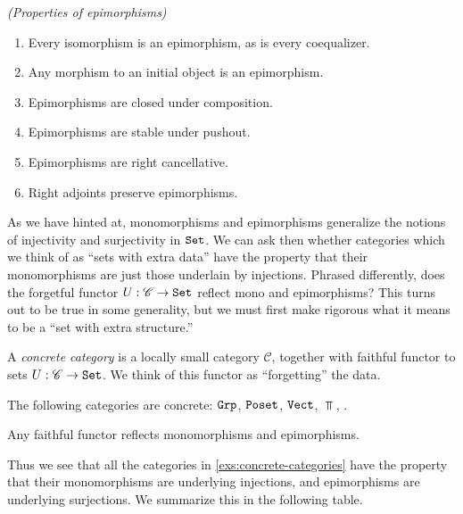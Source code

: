 \begin{exercise}\label{exer:properties-of-epimorphisms} \textit{(Properties of epimorphisms)}
\begin{enumerate}
    \item Every isomorphism is an epimorphism, as is every coequalizer.
    \item Any morphism to an initial object is an epimorphism.
    \item Epimorphisms are closed under composition.
    \item Epimorphisms are stable under pushout.
    \item Epimorphisms are right cancellative. 
    \item Right adjoints preserve epimorphisms.
\end{enumerate}
\end{exercise}

As we have hinted at, monomorphisms and epimorphisms generalize the notions of injectivity and surjectivity in $\texttt{Set}$. We can ask then whether categories which we think of as ``sets with extra data'' have the property that their monomorphisms are just those underlain by injections. Phrased differently, does the forgetful functor $U: \mathscr{C} \to \texttt{Set}$ reflect mono and epimorphisms? This turns out to be true in some generality, but we must first make rigorous what it means to be a ``set with extra structure.''

\begin{definition}\label{def:concrete-category} A \textit{concrete category} is a locally small category $\mathscr{C}$, together with faithful functor to sets $U : \mathscr{C} \to \texttt{Set}$. We think of this functor as ``forgetting'' the data.
\end{definition}

\begin{examples}\label{exs:concrete-categories} The following categories are concrete: $\texttt{Grp}$, $\texttt{Poset}$, $\texttt{Vect}$, $\Top$, .
\end{examples}


\begin{proposition} Any faithful functor reflects monomorphisms and epimorphisms.
\end{proposition}

Thus we see that all the categories in \autoref{exs:concrete-categories} have the property that their monomorphisms are underlying injections, and epimorphisms are underlying surjections. We summarize this in the following table.

